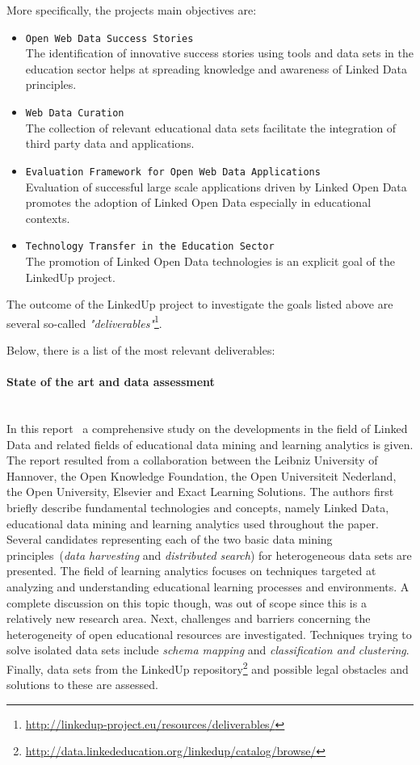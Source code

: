 \documentclass{article}
\begin{document}
More specifically, the projects main objectives are:
\begin{itemize}
	\item \texttt{Open Web Data Success Stories}~\\
	The identification of innovative success stories using tools and data sets in the education sector helps at spreading knowledge and awareness of Linked Data 
	principles. 
	\item \texttt{Web Data Curation}~\\
	The collection of relevant educational data sets facilitate the integration of third party data and applications. 
	\item \texttt{Evaluation Framework for Open Web Data Applications}~\\
	Evaluation of successful large scale applications driven by Linked Open Data promotes the adoption of Linked Open Data especially in educational contexts. 
	\item \texttt{Technology Transfer in the Education Sector}~\\
	The promotion of Linked Open Data technologies is an explicit goal of the LinkedUp project. 
\end{itemize}

The outcome of the LinkedUp project to investigate the goals listed above are several so-called \textit{"deliverables"}\footnote{\url{http://linkedup-project.eu/resources/deliverables/}}. 

Below, there is a list of the most relevant deliverables:
\paragraph{State of the art and data assessment}~\\
In this report~\cite{url:linkedup_state_of_the_art_and_data_assessment} a comprehensive study on the developments in the field of Linked Data and
related fields of educational data mining and learning analytics is given. The report resulted from a collaboration between the Leibniz University of Hannover, the Open Knowledge Foundation, the Open Universiteit Nederland, the Open University, Elsevier and Exact Learning Solutions. The authors first briefly describe fundamental technologies and concepts, namely Linked Data, educational data mining and learning analytics used throughout the paper. Several candidates representing each of the two basic data mining principles~(\textit{data harvesting} and \textit{distributed search}) for heterogeneous data sets are presented. The field of learning analytics focuses on techniques targeted at analyzing and understanding educational learning processes and environments. A complete discussion on this topic though, was out of scope since this is a relatively new research area. Next, challenges and barriers concerning the heterogeneity of open educational resources are investigated. Techniques trying to solve isolated data sets include \textit{schema mapping} and \textit{classification and clustering}. Finally, data sets from the LinkedUp repository\footnote{\url{http://data.linkededucation.org/linkedup/catalog/browse/}} and possible legal obstacles and solutions to these are assessed. 
\end{document}
